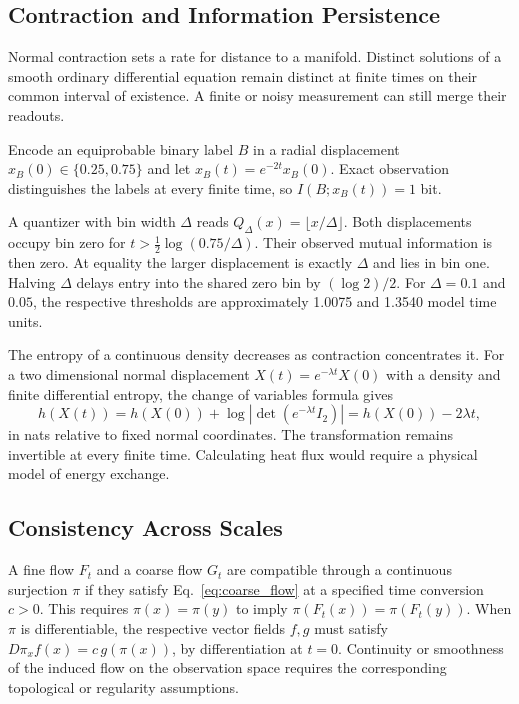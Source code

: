 \documentclass[12pt,a4paper]{article}
\begin{document}
\subsection{Contraction and Information Persistence}\label{sec:information_persistence}

Normal contraction sets a rate for distance to a manifold. Distinct solutions of a smooth ordinary differential equation remain distinct at finite times on their common interval of existence. A finite or noisy measurement can still merge their readouts.

Encode an equiprobable binary label $B$ in a radial displacement $x_B(0)\in\{0.25,0.75\}$ and let $x_B(t)=e^{-2t}x_B(0)$. Exact observation distinguishes the labels at every finite time, so $I(B;x_B(t))=1$ bit.

A quantizer with bin width $\Delta$ reads $Q_\Delta(x)=\lfloor x/\Delta\rfloor$. Both displacements occupy bin zero for $t>\tfrac12\log(0.75/\Delta)$. Their observed mutual information is then zero. At equality the larger displacement is exactly $\Delta$ and lies in bin one. Halving $\Delta$ delays entry into the shared zero bin by $(\log 2)/2$. For $\Delta=0.1$ and $0.05$, the respective thresholds are approximately 1.0075 and 1.3540 model time units.

The entropy of a continuous density decreases as contraction concentrates it. For a two dimensional normal displacement $X(t)=e^{-\lambda t}X(0)$ with a density and finite differential entropy, the change of variables formula gives
\begin{equation}
 h(X(t))=h(X(0))+\log|\det(e^{-\lambda t}I_2)|
 =h(X(0))-2\lambda t,
\end{equation}
in nats relative to fixed normal coordinates. The transformation remains invertible at every finite time. Calculating heat flux would require a physical model of energy exchange.

\subsection{Consistency Across Scales}

A fine flow $F_t$ and a coarse flow $G_t$ are compatible through a continuous surjection $\pi$ if they satisfy Eq.~\eqref{eq:coarse_flow} at a specified time conversion $c>0$. This requires $\pi(x)=\pi(y)$ to imply $\pi(F_t(x))=\pi(F_t(y))$. When $\pi$ is differentiable, the respective vector fields $f,g$ must satisfy $D\pi_x f(x)=c\,g(\pi(x))$, by differentiation at $t=0$. Continuity or smoothness of the induced flow on the observation space requires the corresponding topological or regularity assumptions.
\end{document}
